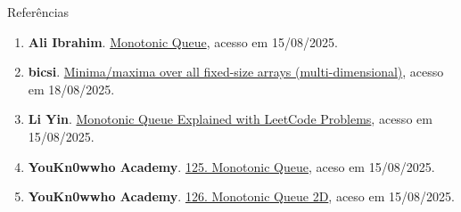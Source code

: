 \begin{frame}[fragile]{Referências}

    \begin{enumerate}
        \item \textbf{Ali Ibrahim}. \href{https://ali-ibrahim137.github.io/competitive/programming/2019/12/08/Monotonic-Queue.html}{Monotonic Queue}, acesso em 15/08/2025.

        \item \textbf{bicsi}. \href{https://codeforces.com/blog/entry/53810}{Minima/maxima over all fixed-size arrays (multi-dimensional)}, acesso em 18/08/2025.

        \item \textbf{Li Yin}. \href{https://medium.com/algorithms-and-leetcode/monotonic-queue-explained-with-leetcode-problems-7db7c530c1d6}{Monotonic Queue Explained with LeetCode Problems}, acesso em 15/08/2025.

        \item \textbf{YouKn0wwho Academy}. \href{https://youkn0wwho.academy/topic-list/monotonous_queue}{125. Monotonic Queue}, aceso em 15/08/2025.

        \item \textbf{YouKn0wwho Academy}. \href{https://youkn0wwho.academy/topic-list/monotonous_queue_2d}{126. Monotonic Queue 2D}, aceso em 15/08/2025.
    \end{enumerate}

\end{frame}
